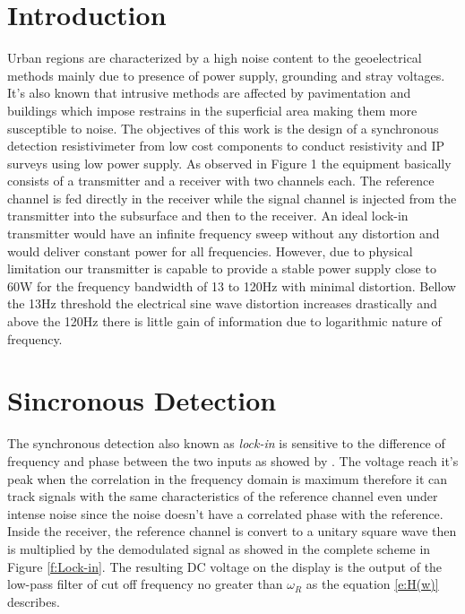 \documentclass{vie16}
\begin{document}
\section{Introduction}
Urban regions are characterized by a high noise content to the
geoelectrical methods mainly due to presence of power supply,
grounding and stray voltages. It's also known that intrusive methods
are affected by pavimentation and buildings which impose restrains in
the superficial area making them more susceptible to noise. The
objectives of this work is the design of a synchronous detection
resistivimeter from low cost components to conduct resistivity and IP
surveys using low power supply.  As observed in Figure 1 the equipment
basically consists of a transmitter and a receiver with two channels
each. The reference channel is fed directly in the receiver while the
signal channel is injected from the transmitter into the subsurface
and then to the receiver. An ideal lock-in transmitter would have an
infinite frequency sweep without any distortion and would deliver
constant power for all frequencies. However, due to physical
limitation our transmitter is capable to provide a stable power supply
close to 60W for the frequency bandwidth of 13 to 120Hz with minimal
distortion.  Bellow the 13Hz threshold the electrical sine wave
distortion increases drastically and above the 120Hz there is little
gain of information due to logarithmic nature of frequency.

\section{Sincronous Detection}
The synchronous detection also known as \textit{lock-in} is sensitive
to the difference of frequency and phase between the two inputs
as showed by \citet{meade13}. The voltage reach it's peak when the
correlation in the frequency domain is maximum therefore it can
track signals with the same characteristics of the reference channel
even under intense noise since the noise doesn't have a correlated
phase with the reference. Inside the receiver, the reference channel is
convert to a unitary square wave then is multiplied by the demodulated
signal as showed in the complete scheme in Figure \ref{f:Lock-in}. The
resulting DC voltage on the display is the output of the low-pass
filter of cut off frequency no greater than $\omega_{R}$ 
 as the equation \ref{e:H(w)} describes. %
\end{document}
